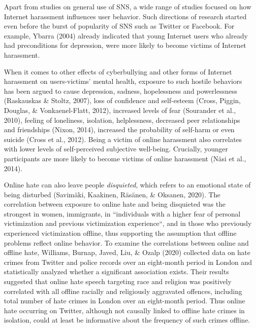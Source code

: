 \documentclass[10pt,dvipsnames]{scrartcl}
\begin{document}
Apart from studies on general use of SNS, a wide range of studies
focused on how Internet harassment influences user behavior. Such
directions of research started even before the burst of popularity of
SNS such as Twitter or Facebook. For example, Ybarra (2004) already
indicated that young Internet users who already had preconditions for
depression, were more likely to become victims of Internet harassment.

When it comes to other effects of cyberbullying and other forms of
Internet harassment on users-victims' mental health, exposure to such
hostile behaviors has been argued to cause depression, sadness,
hopelessness and powerlessness (Raskauskas \& Stoltz, 2007), loss of
confidence and self-esteem (Cross, Piggin, Douglas, \& Vonkaenel-Flatt,
2012), increased levels of fear (Sourander et al., 2010), feeling of
loneliness, isolation, helplessness, decreased peer relationships and
friendships (Nixon, 2014), increased the probability of self-harm or
even suicide (Cross et al., 2012). Being a victim of online harassment
also correlates with lower levels of self-perceived subjective
well-being. Crucially, younger participants are more likely to become
victims of online harassment (Näsi et al., 2014).

Online hate can also leave people \textit{disquieted}, which refers to
an emotional state of being disturbed (Savimäki, Kaakinen, Räsänen, \&
Oksanen, 2020). The correlation between exposure to online hate and
being disquieted was the strongest in women, immigrants, in
``individuals with a higher fear of personal victimization and previous
victimization experience``, and in those who previously experienced
victimization offline, thus supporting the assumption that offline
problems reflect online behavior. To examine the correlations between
online and offline hate, Williams, Burnap, Javed, Liu, \& Ozalp (2020)
collected data on hate crimes from Twitter and police records over an
eight-month period in London and statistically analyzed whether a
significant association exists. Their results suggested that online hate
speech targeting race and religion was positively correlated with all
offline racially and religiously aggravated offences, including total
number of hate crimes in London over an eight-month period. Thus online
hate occurring on Twitter, although not causally linked to offline hate
crimes in isolation, could at least be informative about the frequency
of such crimes offline.
\end{document}
